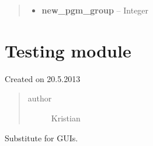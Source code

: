 \documentclass[letterpaper,10pt,english]{sphinxmanual}
\begin{document}
\begin{fulllineitems}
\begin{fulllineitems}
\begin{quote}
\begin{description}
\begin{itemize}
\item {} 
\textbf{new\_pgm\_group} -- Integer

\end{itemize}

\end{description}\end{quote}

\end{fulllineitems}


\end{fulllineitems}



\section{Testing module}
\label{testing:module-testing}\label{testing:testing-module}\label{testing::doc}
Created on 20.5.2013
\begin{quote}\begin{description}
\item[{author}] \leavevmode
Kristian

\end{description}\end{quote}

\begin{fulllineitems}
\label{testing:testing.CallAbsorber}
Substitute for GUIs.

\end{fulllineitems}

\end{document}
